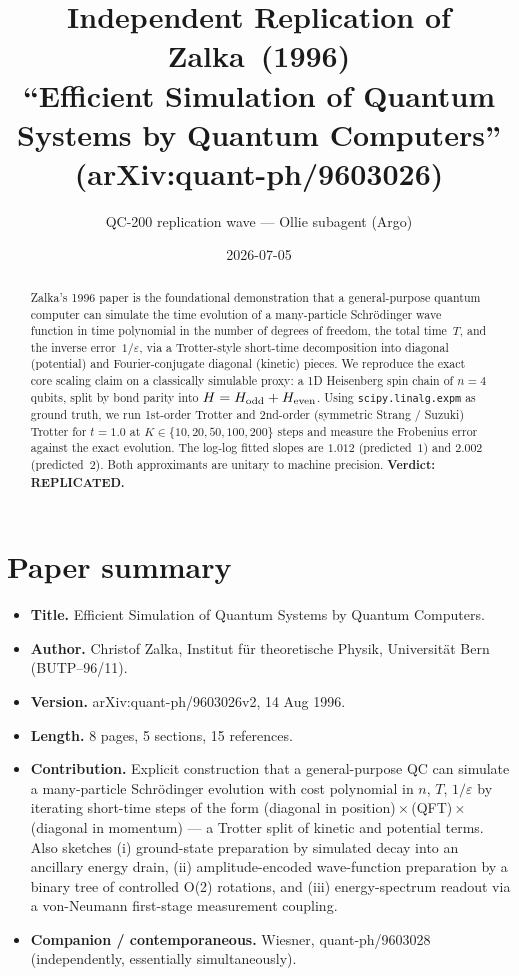 \documentclass[11pt]{article}
\title{Independent Replication of Zalka~(1996)\\
\large ``Efficient Simulation of Quantum Systems by Quantum Computers''\\
(arXiv:quant-ph/9603026)}
\author{QC-200 replication wave --- Ollie subagent (Argo)}
\date{2026-07-05}
\begin{document}
\maketitle

\begin{abstract}
Zalka's 1996 paper is the foundational demonstration that a general-purpose
quantum computer can simulate the time evolution of a many-particle
Schr\"odinger wave function in time polynomial in the number of degrees of
freedom, the total time~$T$, and the inverse error~$1/\varepsilon$, via a
Trotter-style short-time decomposition into diagonal (potential) and
Fourier-conjugate diagonal (kinetic) pieces. We reproduce the exact core
scaling claim on a classically simulable proxy: a 1D Heisenberg
spin chain of $n=4$ qubits, split by bond parity into
$H=H_{\rm odd}+H_{\rm even}$. Using \texttt{scipy.linalg.expm} as ground
truth, we run 1st-order Trotter and 2nd-order (symmetric Strang / Suzuki)
Trotter for $t=1.0$ at $K\in\{10,20,50,100,200\}$ steps and measure the
Frobenius error against the exact evolution. The log-log fitted slopes are
$\mathbf{1.012}$ (predicted~$1$) and $\mathbf{2.002}$ (predicted~$2$). Both
approximants are unitary to machine precision. \textbf{Verdict:
REPLICATED.}
\end{abstract}

\section{Paper summary}
\begin{itemize}
  \item \textbf{Title.} Efficient Simulation of Quantum Systems by Quantum
    Computers.
  \item \textbf{Author.} Christof Zalka, Institut f\"ur theoretische
    Physik, Universit\"at Bern (BUTP--96/11).
  \item \textbf{Version.} arXiv:quant-ph/9603026v2, 14 Aug 1996.
  \item \textbf{Length.} 8 pages, 5 sections, 15 references.
  \item \textbf{Contribution.} Explicit construction that a general-purpose
    QC can simulate a many-particle Schr\"odinger evolution with cost
    polynomial in $n$, $T$, $1/\varepsilon$ by iterating short-time steps
    of the form (diagonal in position)\,$\times$\,(QFT)\,$\times$\,(diagonal
    in momentum) --- a Trotter split of kinetic and potential terms. Also
    sketches (i) ground-state preparation by simulated decay into an
    ancillary energy drain, (ii) amplitude-encoded wave-function
    preparation by a binary tree of controlled O(2) rotations, and
    (iii) energy-spectrum readout via a von-Neumann first-stage
    measurement coupling.
  \item \textbf{Companion / contemporaneous.} Wiesner,
    quant-ph/9603028 (independently, essentially simultaneously).
\end{itemize}
\end{document}
